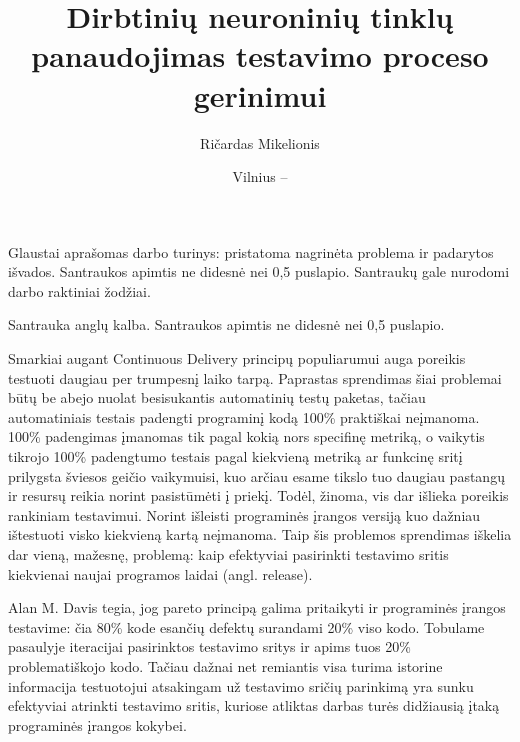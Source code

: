 \documentclass{VUMIFPSbakalaurinis}
\title{Dirbtinių neuroninių tinklų panaudojimas testavimo proceso gerinimui}
\author{Ričardas Mikelionis}
\date{Vilnius – \the\year}
\begin{document}
\maketitle


Glaustai aprašomas darbo turinys: pristatoma nagrinėta problema ir padarytos
išvados. Santraukos apimtis ne didesnė nei 0,5 puslapio. Santraukų gale
nurodomi darbo raktiniai žodžiai. 

Santrauka anglų kalba. Santraukos apimtis ne didesnė nei 0,5 puslapio.

\tableofcontents

Smarkiai augant Continuous Delivery principų populiarumui auga poreikis testuoti daugiau per trumpesnį laiko tarpą. Paprastas sprendimas šiai problemai būtų be abejo nuolat besisukantis automatinių testų paketas, tačiau automatiniais testais padengti programinį kodą 100\% praktiškai neįmanoma. 100\% padengimas įmanomas tik pagal kokią nors specifinę metriką, o vaikytis tikrojo 100\% padengtumo testais pagal kiekvieną metriką ar funkcinę sritį prilygsta šviesos geičio vaikymuisi, kuo arčiau esame tikslo tuo daugiau pastangų ir resursų reikia norint pasistūmėti į priekį. Todėl, žinoma, vis dar išlieka poreikis rankiniam testavimui. Norint išleisti programinės įrangos versiją kuo dažniau ištestuoti visko kiekvieną kartą neįmanoma. Taip šis problemos sprendimas iškelia dar vieną, mažesnę, problemą: kaip efektyviai pasirinkti testavimo sritis kiekvienai naujai programos laidai (angl. release). 

Alan M. Davis \cite{Davis:1995:PSD:203406} tegia, jog pareto principą galima pritaikyti ir programinės įrangos testavime: čia 80\% kode esančių defektų surandami 20\% viso kodo. Tobulame pasaulyje iteracijai pasirinktos testavimo sritys ir apims tuos 20\% problematiškojo kodo. Tačiau dažnai net remiantis visa turima istorine informacija testuotojui atsakingam už testavimo sričių parinkimą yra sunku efektyviai atrinkti testavimo sritis, kuriose atliktas darbas turės didžiausią įtaką programinės įrangos kokybei.
\end{document}
